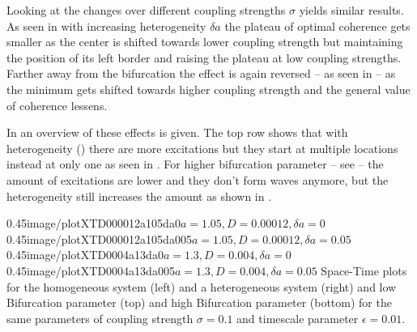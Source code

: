 Looking at the changes over different coupling strengths $\sigma$ yields similar results. As seen in  with increasing heterogeneity $\delta a$ the
plateau of optimal coherence gets smaller as the center is shifted towards lower coupling strength but maintaining the position of its left border
and raising the plateau at low coupling strengths. Farther away from the bifurcation the effect is again reversed -- as seen in  --
as the minimum gets shifted towards higher coupling strength and the general value of coherence lessens.


In  an overview of these effects is given.
The top row shows that with heterogeneity () there are more excitations but they start at multiple locations instead
at only one as seen in .
For higher bifurcation parameter -- see  -- the amount of excitations are lower and they don't form waves anymore,
but the heterogeneity still increases the amount as shown in .

	{0.45}{image/plotXTD000012a105da0}{$a = 1.05, D = 0.00012, \delta a = 0$}
	{0.45}{image/plotXTD000012a105da005}{$a = 1.05, D = 0.00012, \delta a = 0.05$}
	{0.45}{image/plotXTD0004a13da0}{$a = 1.3, D = 0.004, \delta a = 0$}
	{0.45}{image/plotXTD0004a13da005}{$a = 1.3, D = 0.004, \delta a = 0.05$}{
	Space-Time plots for the homogeneous system (left) and a heterogeneous system (right) and
	low Bifurcation parameter (top) and high Bifurcation parameter (bottom) for the same parameters of
	coupling strength $\sigma = 0.1$ and timescale parameter $\epsilon = 0.01$.
}